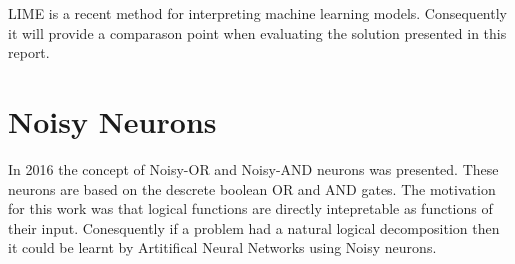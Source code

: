 LIME is a recent method for interpreting machine learning models. Consequently it will provide a comparason point when evaluating the solution presented in this report.

\section{Noisy Neurons} \label{sec:background-noisy-neurons}
In 2016 the concept of Noisy-OR and Noisy-AND neurons \cite{LearningLogicalActivations} was presented. These neurons are based on the descrete boolean OR and AND gates. The motivation for this work was that logical functions are directly intepretable as functions of their input. Conesquently if a problem had a natural logical decomposition then it could be learnt by Artitifical Neural Networks using Noisy neurons.

